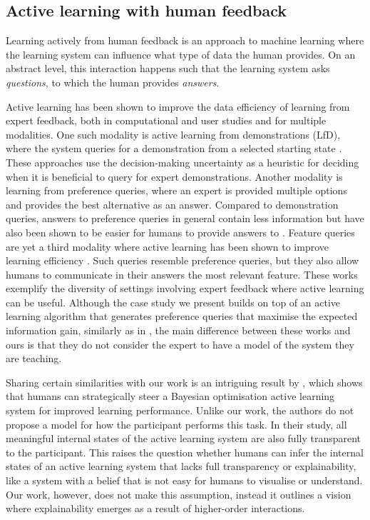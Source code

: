 \documentclass[letterpaper]{article} %
\begin{document}
\subsection{Active learning with human feedback}

Learning actively from human feedback is an approach to machine learning where the learning system can influence what type of data the human provides. On an abstract level, this interaction happens such that the learning system asks \textit{questions}, to which the human provides \textit{answers}.

Active learning has been shown to improve the data efficiency of learning from expert feedback, both in computational and user studies and for multiple modalities. One such modality is active learning from demonstrations (LfD), where the system queries for a demonstration from a selected starting state \cite{Silver2012ActiveLfD, Chen2020ActiveDQN}. These approaches use the decision-making uncertainty as a heuristic for deciding when it is beneficial to query for expert demonstrations. Another modality is learning from preference queries, where an expert is provided multiple options and provides the best alternative as an answer. Compared to demonstration queries, answers to preference queries in general contain less information but have also been shown to be easier for humans to provide answers to \cite{biyik2022dempref, biyik2023ActivePreferenceGP}. Feature queries are yet a third modality where active learning has been shown to improve learning efficiency \cite{Basu2018learning}. Such queries resemble preference queries, but they also allow humans to communicate in their answers the most relevant feature. These works exemplify the diversity of settings involving expert feedback where active learning can be useful. Although the case study we present builds on top of an active learning algorithm that generates preference queries that maximise the expected information gain, similarly as in \cite{biyik2022dempref}, the main difference between these works and ours is that they do not consider the expert to have a model of the system they are teaching.

Sharing certain similarities with our work is an intriguing result by \cite{colella2020strategic}, which shows that humans can strategically steer a Bayesian optimisation active learning system for improved learning performance. Unlike our work, the authors do not propose a model for how the participant performs this task. In their study, all meaningful internal states of the active learning system are also fully transparent to the participant. This raises the question whether humans can infer the internal states of an active learning system that lacks full transparency or explainability, like a system with a belief that is not easy for humans to visualise or understand. Our work, however, does not make this assumption, instead it outlines a vision where explainability emerges as a result of higher-order interactions.
\end{document}

